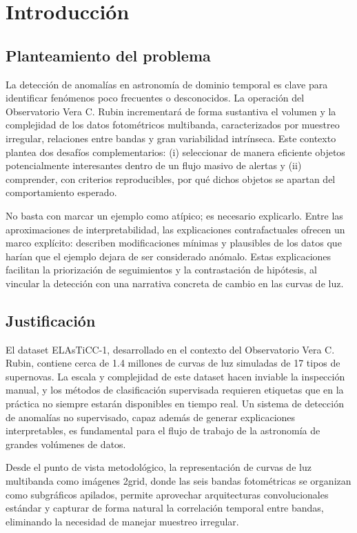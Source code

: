 \chapter{Introducción}

\section{Planteamiento del problema}

La detección de anomalías en astronomía de dominio temporal es clave para identificar fenómenos poco frecuentes o desconocidos. La operación del Observatorio Vera C. Rubin incrementará de forma sustantiva el volumen y la complejidad de los datos fotométricos multibanda, caracterizados por muestreo irregular, relaciones entre bandas y gran variabilidad intrínseca. Este contexto plantea dos desafíos complementarios: (i) seleccionar de manera eficiente objetos potencialmente interesantes dentro de un flujo masivo de alertas y (ii) comprender, con criterios reproducibles, por qué dichos objetos se apartan del comportamiento esperado.

No basta con marcar un ejemplo como atípico; es necesario explicarlo. Entre las aproximaciones de interpretabilidad, las explicaciones contrafactuales ofrecen un marco explícito: describen modificaciones mínimas y plausibles de los datos que harían que el ejemplo dejara de ser considerado anómalo. Estas explicaciones facilitan la priorización de seguimientos y la contrastación de hipótesis, al vincular la detección con una narrativa concreta de cambio en las curvas de luz.

\section{Justificación}

El dataset ELAsTiCC-1, desarrollado en el contexto del Observatorio Vera C. Rubin, contiene cerca de 1.4 millones de curvas de luz simuladas de 17 tipos de supernovas. La escala y complejidad de este dataset hacen inviable la inspección manual, y los métodos de clasificación supervisada requieren etiquetas que en la práctica no siempre estarán disponibles en tiempo real. Un sistema de detección de anomalías no supervisado, capaz además de generar explicaciones interpretables, es fundamental para el flujo de trabajo de la astronomía de grandes volúmenes de datos.

Desde el punto de vista metodológico, la representación de curvas de luz multibanda como imágenes 2grid, donde las seis bandas fotométricas se organizan como subgráficos apilados, permite aprovechar arquitecturas convolucionales estándar y capturar de forma natural la correlación temporal entre bandas, eliminando la necesidad de manejar muestreo irregular.

